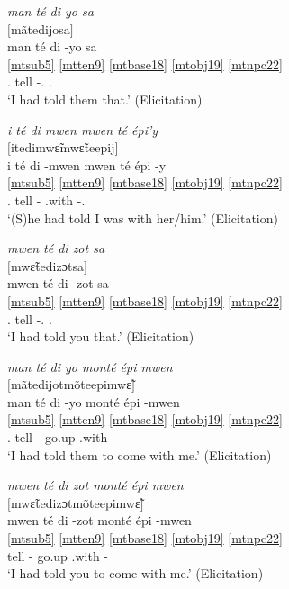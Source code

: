 \documentclass[output=paper]{langscibook}
\begin{document}
\ea\label{bkm:Ref105166580}
\textit{man té di yo sa}\\
$[$mãtedijosa$]$\\
\glll man té di -yo sa\\
\ref{mtsub5} \ref{mtten9} \ref{mtbase18} \ref{mtobj19} \ref{mtnpc22}\\
\First\Sg.\Sarg{} \Pst{} tell -\Third\Pl.\Obj{} \Dem{}.\Pr{}\\
\glt `I had told them that.' (Elicitation)
\z


\ea\label{bkm:Ref105167067}
\textit{i té di mwen mwen té épi’y}\\
$[$itedimwɛ̃mwɛ̃teepij$]$\\
\glll i té di -mwen mwen té épi -y\\
\ref{mtsub5} \ref{mtten9} \ref{mtbase18} \ref{mtobj19} \ref{mtnpc22} {} {} {} \\
\Third\Sg.\Sarg{} \Pst{} tell -\First\Sg{} \First\Sg{} \Pst{} \Prep{}.with -\Third\Sg.\Obj{}\\
\glt `(S)he had told I was with her/him.' (Elicitation)
\z

 
\ea\label{bkm:Ref105167130}
\textit{mwen té di zot sa}\\
$[$mwɛ̃tedizɔtsa$]$\\
\glll mwen té di -zot sa\\
\ref{mtsub5} \ref{mtten9} \ref{mtbase18} \ref{mtobj19} \ref{mtnpc22} \\
\First\Sg.\Sarg{} \Pst{} tell -\Second\Pl.\Obj{} \Dem{}.\Pr{}\\
\glt `I had told you that.' (Elicitation)
\z

\ea\label{bkm:Ref105167256}
\textit{man té di yo monté épi mwen}\\
$[$mãtedijotmõteepimwɛ̃$]$\\
\glll man té di -yo monté épi -mwen\\
\ref{mtsub5} \ref{mtten9} \ref{mtbase18} \ref{mtobj19} \ref{mtnpc22} {} {} \\
\First\Sg.\Sarg{} \Pst{} tell -\Third\Pl{} go.up \Prep{}.with --\First\Sg{}\\
\glt `I had told them to come with me.' (Elicitation)
\z


\ea\label{bkm:Ref105168971}
\textit{mwen té di zot monté épi mwen}\\
$[$mwɛ̃tedizɔtmõteepimwɛ̃$]$\\
\glll mwen té di -zot monté épi -mwen\\
  \ref{mtsub5} \ref{mtten9} \ref{mtbase18} \ref{mtobj19} \ref{mtnpc22} {} {} \\
\First\Sg{} \Pst{} tell -\Second\Pl{} go.up \Prep{}.with -\First\Sg{}\\
\glt `I had told you to come with me.' (Elicitation)
\z
\end{document}

